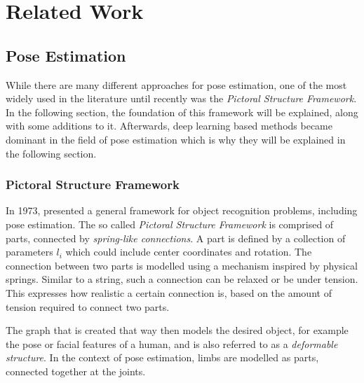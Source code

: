\chapter{Related Work}

\section{Pose Estimation}



While there are many different approaches for pose estimation, one of the most widely used in the literature until recently was the \textit{Pictoral Structure Framework}.
In the following section, the foundation of this framework will be explained, along with some additions to it.
Afterwards, deep learning based methods became dominant in the field of pose estimation which is why they will be explained in the following section.


\subsection{Pictoral Structure Framework}
In 1973, \cite{fischler_representation_1973} presented a general framework for object recognition problems, including pose estimation.
The so called \textit{Pictoral Structure Framework} is comprised of parts, connected by \textit{spring-like connections}.
A part is defined by a collection of parameters $l_i$ which could include center coordinates and rotation.
The connection between two parts is modelled using a mechanism inspired by physical springs.
Similar to a string, such a connection can be relaxed or be under tension.
This expresses how realistic a certain connection is, based on the amount of tension required to connect two parts.

The graph that is created that way then models the desired object, for example the pose or facial features of a human, and is also referred to as a \textit{deformable structure}.
In the context of pose estimation, limbs are modelled as parts, connected together at the joints.

